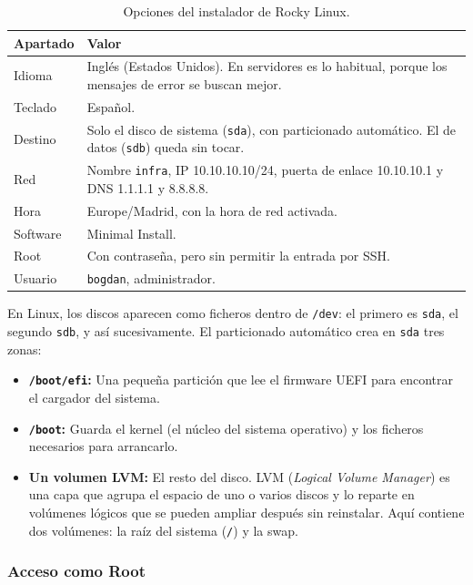 \documentclass[11pt, a4paper, titlepage]{article}
\newcommand{\cod}[1]{\texttt{#1}}
\begin{document}
\begin{table}[H]
\centering
\small
\begin{tabular}{lp{10.5cm}}
\toprule
\textbf{Apartado} & \textbf{Valor} \\
\midrule
Idioma & Inglés (Estados Unidos). En servidores es lo habitual, porque los mensajes de error se buscan mejor. \\
Teclado & Español. \\
Destino & Solo el disco de sistema (\cod{sda}), con particionado automático. El de datos (\cod{sdb}) queda sin tocar. \\
Red & Nombre \cod{infra}, IP 10.10.10.10/24, puerta de enlace 10.10.10.1 y DNS 1.1.1.1 y 8.8.8.8. \\
Hora & Europe/Madrid, con la hora de red activada. \\
Software & Minimal Install. \\
Root & Con contraseña, pero sin permitir la entrada por SSH. \\
Usuario & \cod{bogdan}, administrador. \\
\bottomrule
\end{tabular}
\caption{Opciones del instalador de Rocky Linux.}
\label{tab:instalador}
\end{table}

En Linux, los discos aparecen como ficheros dentro de \cod{/dev}: el primero es \cod{sda}, el segundo \cod{sdb}, y así sucesivamente. El particionado automático crea en \cod{sda} tres zonas:

\begin{itemize}
    \item \textbf{\cod{/boot/efi}:} Una pequeña partición que lee el firmware UEFI para encontrar el cargador del sistema.
    \item \textbf{\cod{/boot}:} Guarda el kernel (el núcleo del sistema operativo) y los ficheros necesarios para arrancarlo.
    \item \textbf{Un volumen LVM:} El resto del disco. LVM (\textit{Logical Volume Manager}) es una capa que agrupa el espacio de uno o varios discos y lo reparte en volúmenes lógicos que se pueden ampliar después sin reinstalar. Aquí contiene dos volúmenes: la raíz del sistema (\cod{/}) y la swap.
\end{itemize}

\subsubsection{Acceso como Root}
\end{document}
